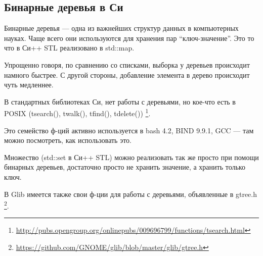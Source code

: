 \subsection{Бинарные деревья в Си}

Бинарные деревья --- одна из важнейших структур данных в компьютерных науках.
Чаще всего они используются для хранения пар ``ключ-значение''. Это то что в Си++ STL реализовано в std::map.

Упрощенно говоря, по сравнению со списками, выборка у деревьев происходит намного быстрее.
С другой стороны, добавление элемента в дерево происходит чуть медленнее.

В стандартных библиотеках Си, нет работы с деревьями, но кое-что есть в POSIX 
(tsearch(), twalk(), tfind(), tdelete())
\footnote{\url{http://pubs.opengroup.org/onlinepubs/009696799/functions/tsearch.html}}.

Это семейство ф-ций активно используется в bash 4.2, BIND 9.9.1, GCC --- там можно посмотреть, как использовать
это.

Множество (std::set в Си++ STL) можно реализовать так же просто при помощи бинарных деревьев, достаточно
просто не хранить значение, а хранить только ключ.

В Glib имеется также свои ф-ции для работы с деревьями, объявленные в gtree.h
\footnote{\url{https://github.com/GNOME/glib/blob/master/glib/gtree.h}}.

